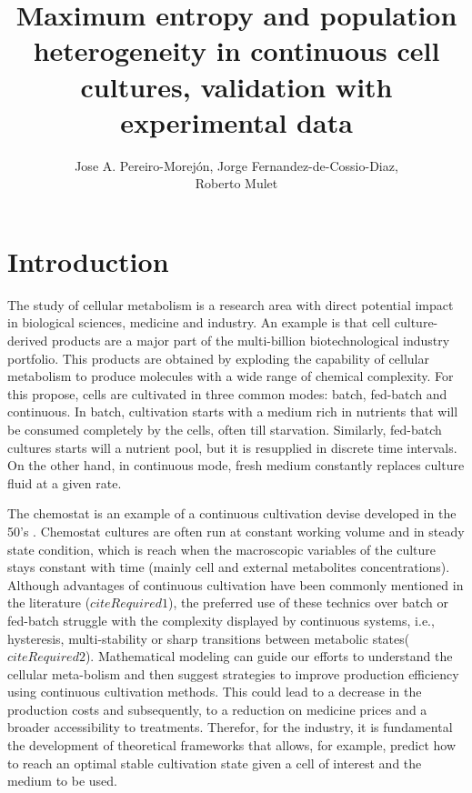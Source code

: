\documentclass[]{article}
\title{Maximum entropy and population heterogeneity in 
	continuous cell cultures, validation with experimental data}
\author{Jose A. Pereiro-Morejón, Jorge Fernandez-de-Cossio-Diaz, \\ 
	Roberto Mulet }
\begin{document}
	
	\maketitle
	
	\section{Introduction}

	The study of cellular metabolism is a research area with direct potential 
	impact in biological sciences, medicine and industry.
	An example is that cell culture-derived products are a major part of the 
	multi-billion biotechnological industry portfolio. 
	This products are obtained by exploding the capability of cellular metabolism 
	to produce molecules with a wide range of chemical complexity. 
	For this propose, cells are cultivated in three common modes: batch, 
	fed-batch and continuous. 
	In batch, cultivation starts with a medium rich in nutrients that will be 
	consumed completely by the cells, often till starvation. 
	Similarly, fed-batch cultures starts will a nutrient pool, but it is 
	resupplied in discrete time intervals. 
	On the other hand, in continuous mode, fresh medium constantly replaces 
	culture fluid at a given rate.

	The chemostat is an example of a continuous cultivation devise developed 
	in the 50's \cite{monodGrowthBacterialCultures1949, novickDescriptionChemostat1950}. 
	Chemostat cultures are often run at constant working volume and in steady state 
	condition, which is reach when the macroscopic variables of the culture stays 
	constant with time (mainly cell and external metabolites concentrations). 	
	Although advantages of continuous cultivation have been commonly mentioned 
	in the literature ($citeRequired1$), the preferred use of these technics over 
	batch or fed-batch struggle with the complexity displayed by continuous systems, 
	i.e., hysteresis, multi-stability or sharp transitions between metabolic states($citeRequired2$). 
	Mathematical modeling can guide our efforts to understand the cellular meta-bolism and 
	then suggest strategies to improve production efficiency using continuous cultivation methods. 
	This could lead to a decrease in the production costs and subsequently, to a reduction 
	on medicine prices and a broader accessibility to treatments.
	Therefor, for the industry, it is fundamental the development of theoretical frameworks 
	that allows, for example, predict how to reach an optimal stable cultivation state given 
	a cell of interest and the medium to be used.
\end{document}

